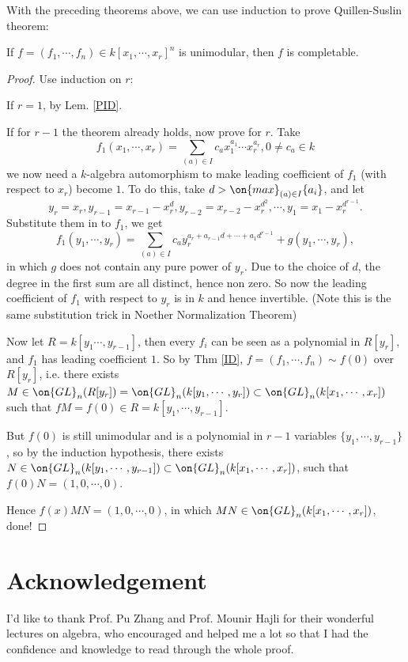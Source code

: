 With the preceding theorems above, we can use induction to prove Quillen-Suslin theorem:
\begin{thm}
	If $f=(f_1,\cdots,f_n)\in k[x_1,\cdots,x_r]^n$ is unimodular, then $f$ is completable.
\end{thm}
\begin{proof}
	Use induction on $r$:

	If $r=1$, by Lem. \ref{PID}.
	
	If for $r-1$ the theorem already holds, now prove for $r$. Take
	$$
	f_1(x_1,\cdots,x_r)=\sum_{(a)\in I} c_{a}x_1^{a_1}\cdots x_r^{a_r}, 0\neq c_a\in k
	$$
	we now need a $k$-algebra automorphism to make leading coefficient of $f_1$ (with respect to $x_r$) become $1$. To do this, take $d>\on{max}_{(a)\in I}\{a_i\}$, and let
	$$
	y_r = x_r, y_{r-1} = x_{r-1}-x_r^d, y_{r-2}=x_{r-2}-x_r^{d^2},\cdots, y_1=x_1-x_r^{d^{r-1}}.
	$$
	Substitute them in to $f_1$, we get
	$$
	f_1(y_1,\cdots,y_r)=\sum_{(a)\in I}c_ay_r^{a_r+a_{r-1}d+\cdots+a_1d^{r-1}}+g(y_1,\cdots,y_r),
	$$
	in which $g$ does not contain any pure power of $y_r$. Due to the choice of $d$, the degree in the first sum are all distinct, hence non zero. So now the leading coefficient of $f_1$ with respect to $y_r$ is in $k$ and hence invertible. (Note this is the same substitution trick in Noether Normalization Theorem)
	
	Now let $R=k[y_1\cdots,y_{r-1}]$, then every $f_i$ can be seen as a polynomial in $R[y_r]$, and $f_1$ has leading coefficient $1$. So by Thm \ref{ID}, $f=(f_1,\cdots, f_n)\sim f(0)$ over $R[y_r]$, i.e. there exists $M\in\on{GL}_n(R[y_r])=\on{GL}_n(k[y_1,\cdots,y_r])\subset\on{GL}_n(k[x_1,\cdots,x_r])$ such that $fM=f(0)\in R=k[y_1,\cdots,y_{r-1}]$.
	
	But $f(0)$ is still unimodular and is a polynomial in $r-1$ variables $\{y_1,\cdots,y_{r-1}\}$, so by the induction hypothesis, there exists $N\in\on{GL}_n(k[y_1,\cdots,y_{r-1}])\subset\on{GL}_n(k[x_1,\cdots,x_r])$, such that $f(0)N=(1,0,\cdots,0)$.
	
	Hence $f(x)MN = (1,0,\cdots,0)$, in which $MN\in \on{GL}_n(k[x_1,\cdots,x_r])$, done!
\end{proof}


\section*{Acknowledgement}
  I'd like to thank Prof. Pu Zhang and Prof. Mounir Hajli for their wonderful lectures on algebra, who encouraged and helped me a lot so that I had the confidence and knowledge to read through the whole proof.






